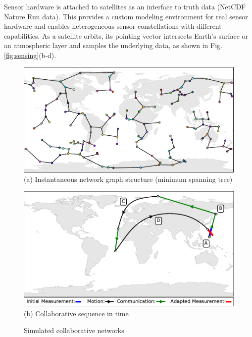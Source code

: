 \documentclass[conference]{IEEEtran}
\begin{document}
Sensor hardware is attached to satellites as an interface to truth data (NetCDF Nature Run data).  This provides a custom modeling environment for real sensor hardware and enables heterogeneous sensor constellations with different capabilities.  As a satellite orbits, its pointing vector intersects Earth's surface or an atmospheric layer and samples the underlying data, as shown in Fig.\ref{fig:sensing}(b-d).

\begin{figure}[t]
  \begin{minipage}[b]{\linewidth}
    \begin{center}
      \includegraphics[width=\textwidth]{images/prim.pdf}
      {\footnotesize(a) Instantaneous network graph structure (minimum spanning
        tree)}
    \end{center}
    \medskip
  \end{minipage}
  \begin{minipage}[b]{\linewidth}
    \begin{center}
      \includegraphics[width=\textwidth]{images/collaborate.pdf}
      {\footnotesize(b) Collaborative sequence in time}
    \end{center}
  \end{minipage}
  \caption{Simulated collaborative networks}
  \label{fig:collab}
\end{figure}
\end{document}
